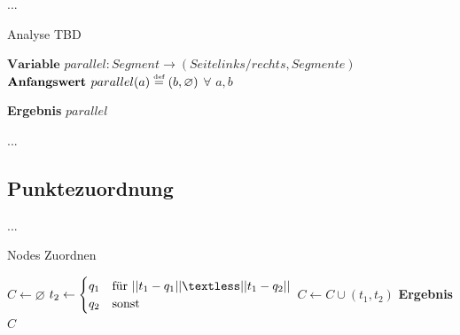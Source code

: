 \documentclass[../main/thesis.tex]{subfiles}
\begin{document}
...

\begin{algorithm}[H]
\caption{Analyse TBD}\label{alg:Analyse}
$\textbf{Variable } parallel : Segment \rightarrow (Seite links/rechts, Segmente)$
\\$\textbf{Anfangswert } parallel(a) \stackrel{\text{\tiny def}}{=} (b, \varnothing)$ $\forall$ $a,b$
\begin{algorithmic}
	\State \textbf{Ergebnis} $parallel$
\EndFunction
\end{algorithmic}
\end{algorithm}


%
%

...


\subsection{Punktezuordnung}

%
%

...

\begin{algorithm}[H]
\caption{Nodes Zuordnen}\label{alg:Zuordnen}
\begin{algorithmic}
	\State $C \gets \varnothing$
				\State $t_2 \gets \begin{cases}q_1 & \text{für } ||t_1 - q_1|| \textless ||t_1 - q_2||\\q_2 & \text{sonst}\end{cases}$
				\State $C \gets C \cup (t_1, t_2)$
			\EndFor
		\EndFor
	\EndFor
	\State \textbf{Ergebnis} $C$
\EndFunction
\end{algorithmic}
\end{algorithm}
\end{document}
